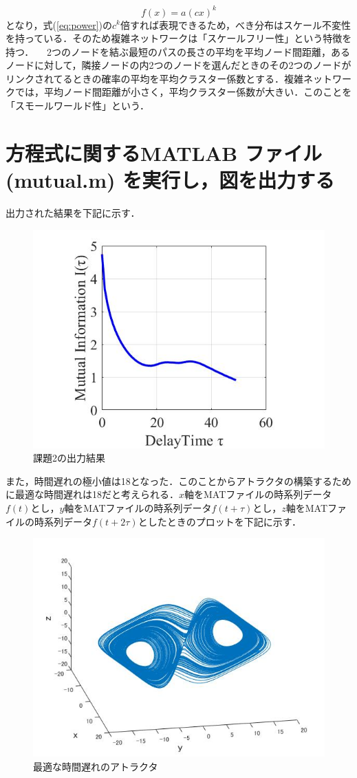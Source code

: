 \documentclass[autodetect-engine,dvipdfmx-if-dvi,ja=standard,a4paper,11pt]{bxjsarticle} %
\begin{document}
\begin{itemize}
\begin{equation}
\label{eq:power2}
f(x)=a(cx)^k
\end{equation}
となり，式(\ref{eq:power})の$c^k$倍すれば表現できるため，べき分布はスケール不変性を持っている．そのため複雑ネットワークは「スケールフリー性」という特徴を持つ．
　2つのノードを結ぶ最短のパスの長さの平均を平均ノード間距離，あるノードに対して，隣接ノードの内2つのノードを選んだときのその2つのノードがリンクされてるときの確率の平均を平均クラスター係数とする．複雑ネットワークでは，平均ノード間距離が小さく，平均クラスター係数が大きい．このことを「スモールワールド性」という．
\\

\end{itemize}


\section{ 方程式に関するMATLAB ファイル(mutual.m) を実行し，図を出力する}
出力された結果を下記に示す．

\begin{figure}[H]%
\begin{center}
\includegraphics[width=.4\textwidth]{kadai2_rusult.jpg}
\end{center}
\caption{課題2の出力結果}%
\label{fig:kadai2}
\end{figure}

また，時間遅れの極小値は18となった．このことからアトラクタの構築するために最適な時間遅れは18だと考えられる．$x$軸をMATファイルの時系列データ$f(t)$とし，$y$軸をMATファイルの時系列データ$f(t+\tau)$とし，$z$軸をMATファイルの時系列データ$f(t+2\tau)$としたときのプロットを下記に示す．

\begin{figure}[H]%
\begin{center}
\includegraphics[width=.4\textwidth]{kadai2_rusult2.jpg}
\end{center}
\caption{最適な時間遅れのアトラクタ}%
\label{fig:kadai22}
\end{figure}
\end{document}
